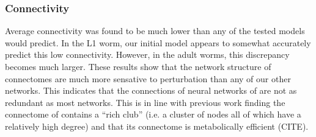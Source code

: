 \subsubsection{Connectivity} Average connectivity was found to be much lower than any of the tested models would predict. 
In the L1 worm, our initial model appears to somewhat accurately predict this low connectivity. 
However, in the adult worms, this discrepancy becomes much larger. 
These results show that the network structure of \ce connectomes are much more sensative to perturbation than any of our other networks.
This indicates that the connections of neural networks of \ce are not as redundant as most networks. 
This is in line with previous work finding the connectome of \ce contains a ``rich club'' (i.e. a cluster of nodes all of which have a relatively high degree) and that its connectome is metabolically efficient (CITE).